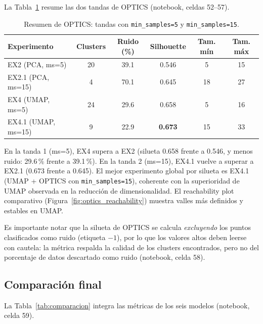 \documentclass[11pt,a4paper]{article}
\begin{document}
La Tabla~\ref{tab:optics} resume las dos tandas de OPTICS (notebook, celdas 52--57).

\begin{table}[H]
  \centering
  \caption{Resumen de OPTICS: tandas con \texttt{min\_samples=5} y \texttt{min\_samples=15}.}
  \label{tab:optics}
  \begin{tabular}{@{}lccccc@{}}
    \toprule
    \textbf{Experimento} & \textbf{Clusters} & \textbf{Ruido (\%)} & \textbf{Silhouette} & \textbf{Tam. mín} & \textbf{Tam. máx} \\
    \midrule
    EX2 (PCA, ms=5) & 20 & 39.1 & 0.546 & 5 & 15 \\
    EX2.1 (PCA, ms=15) & 4 & 70.1 & 0.645 & 18 & 27 \\
    EX4 (UMAP, ms=5) & 24 & 29.6 & 0.658 & 5 & 16 \\
    EX4.1 (UMAP, ms=15) & 9 & 22.9 & \textbf{0.673} & 15 & 33 \\
    \bottomrule
  \end{tabular}
\end{table}

En la tanda 1 (ms=5), EX4 supera a EX2 (silueta 0.658 frente a 0.546, y menos ruido:
29.6\,\% frente a 39.1\,\%). En la tanda 2 (ms=15), EX4.1 vuelve a superar a EX2.1 (0.673
frente a 0.645). El mejor experimento global por silueta es EX4.1 (UMAP + OPTICS con
\texttt{min\_samples=15}), coherente con la superioridad de UMAP observada en la reducción de
dimensionalidad. El reachability plot comparativo (Figura~\ref{fig:optics_reachability})
muestra valles más definidos y estables en UMAP.

Es importante notar que la silueta de OPTICS se calcula \emph{excluyendo} los puntos
clasificados como ruido (etiqueta $-1$), por lo que los valores altos deben leerse con
cautela: la métrica respalda la calidad de los clusters encontrados, pero no del porcentaje
de datos descartado como ruido (notebook, celda 58).

\subsection{Comparación final}

La Tabla~\ref{tab:comparacion} integra las métricas de los seis modelos (notebook, celda 59).
\end{document}

